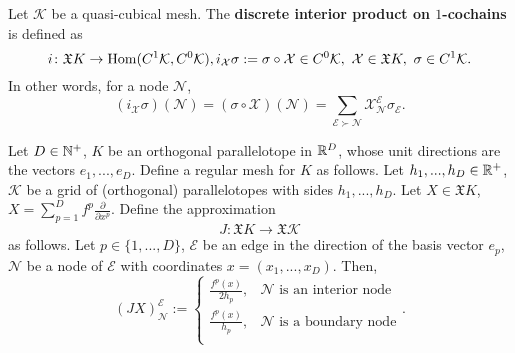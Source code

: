 \begin{definition}
  Let $\mathcal{K}$ be a quasi-cubical mesh.
  The \textbf{discrete interior product on $1$-cochains} is defined as
  \begin{equation}
    i \colon \mathfrak{X} K \to \mathop{\rm Hom}\nolimits(C^1 \mathcal{K}, C^0 \mathcal{K}),
    i_{\mathcal{X}} \sigma := \sigma \circ \mathcal{X} \in C^0 \mathcal{K},\
    \mathcal{X} \in \mathfrak{X} K,\ \sigma \in C^1 \mathcal{K}.
  \end{equation}
  In other words, for a node $\mathcal{N}$,
  \begin{equation}
    (i_{\mathcal{X}} \sigma)(\mathcal{N})
    = (\sigma \circ \mathcal{X})(\mathcal{N})
    = \sum_{\mathcal{E} \succ \mathcal{N}}
      \mathcal{X}^{\mathcal{E}}_{\mathcal{N}} \sigma_{\mathcal{E}}.
  \end{equation}
\end{definition}
\begin{definition}
  Let
    $D \in \mathbb{N}^+$,
    $K$ be an orthogonal parallelotope in $\mathbb{R}^D$,
    whose unit directions are the vectors $e_1, ..., e_D$.
  Define a regular mesh for $K$ as follows.
  Let
    $h_1, ..., h_D \in \mathbb{R}^+$,
    $\mathcal{K}$ be a grid of (orthogonal) parallelotopes with sides
      $h_1, ..., h_D$.
  Let $X \in \mathfrak{X} K$,
  $X = \sum_{p = 1}^D f^p \frac{\partial}{\partial x^p}$.
  Define the approximation
  \begin{equation}
    J \colon \mathfrak{X} K \to \mathfrak{X} \mathcal{K}
  \end{equation}
  as follows.
  Let $p \in \{1, ..., D\}$,
  $\mathcal{E}$ be an edge in the direction of the basis vector $e_p$,
  $\mathcal{N}$ be a node of $\mathcal{E}$ with coordinates
  $x = (x_1, ..., x_D)$.
  Then,
  \begin{equation}
    (J X)^{\mathcal{E}}_{\mathcal{N}} :=
    \begin{cases}
      \frac{f^p(x)}{2 h_p}, & \text{$\mathcal{N}$ is an interior node} \\
      \frac{f^p(x)}{h_p}, & \text{$\mathcal{N}$ is a boundary node} \\
    \end{cases}.
  \end{equation}
\end{definition}
